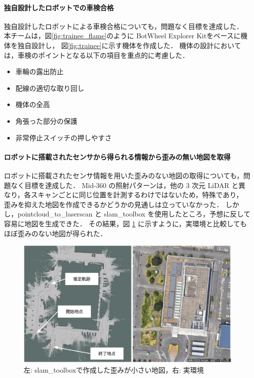 \documentclass[twocolumn,9pt]{jsproceedings}
\begin{document}
\paragraph{独自設計したロボットでの車検合格}
独自設計したロボットによる車検合格についても，問題なく目標を達成した．
本チームは，図\ref{fig:trainee_flame}のように
BotWheel Explorer Kitをベースに機体を独自設計し，
図\ref{fig:trainee}に示す機体を作成した．
機体の設計においては，車検のポイントとなる以下の項目を重点的に考慮した．
\begin{itemize}
  \item 車輪の露出防止
  \item 配線の適切な取り回し
  \item 機体の全高
  \item 角張った部分の保護
  \item 非常停止スイッチの押しやすさ
\end{itemize}


\paragraph{ロボットに搭載されたセンサから得られる情報から歪みの無い地図を取得}

ロボットに搭載されたセンサ情報を用いた歪みのない地図の取得についても，問題なく目標を達成した．
Mid-360 の照射パターンは，他の 3 次元 LiDAR と異なり，各スキャンごとに同じ位置を計測するわけではないため，特殊であり，
歪みを抑えた地図を作成できるかどうかの見通しは立っていなかった．
しかし，pointcloud\_to\_laserscan と slam\_toolbox を使用したところ，予想に反して容易に地図を生成できた．
その結果，図 \ref{fig:map} に示すように，実環境と比較してもほぼ歪みのない地図が得られた．

\begin{figure}[h]
  \begin{center}
    \includegraphics[width=1.0\linewidth]{figs/map.pdf}
    \caption{左: slam\_toolboxで作成した歪みが小さい地図，右: 実環境}
    \label{fig:map}
  \end{center}
\end{figure}
\end{document}
